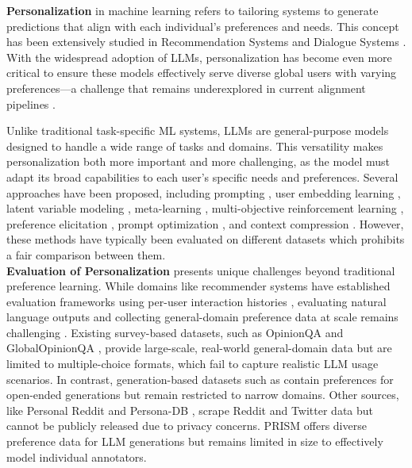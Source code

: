 \textbf{Personalization} in machine learning refers to tailoring systems to generate predictions that align with each individual's preferences and needs. This concept has been extensively studied in Recommendation Systems \cite{sarwar2001item, he2017neural} and Dialogue Systems \cite{zhang1801personalizing, li_persona-based_2016}. With the widespread adoption of LLMs, personalization has become even more critical to ensure these models effectively serve diverse global users with varying preferences—a challenge that remains underexplored in current alignment pipelines \cite{sorensen_roadmap_2024}.


Unlike traditional task-specific ML systems, LLMs are general-purpose models designed to handle a wide range of tasks and domains. This versatility makes personalization both more important and more challenging, as the model must adapt its broad capabilities to each user's specific needs and preferences. Several approaches have been proposed, including prompting \cite{hwang_aligning_2023}, user embedding learning \cite{li_personalized_2024, feng_modular_2024}, latent variable modeling \cite{poddar_personalizing_2024, siththaranjan_distributional_2024}, meta-learning \cite{zhao_group_2023}, multi-objective reinforcement learning \cite{jang_personalized_2023}, preference elicitation \cite{li_eliciting_2023}, prompt optimization \cite{kim_few-shot_2024}, and context compression \cite{kim_compressed_2024}. However, these methods have typically been evaluated on different datasets which prohibits a fair comparison between them.\\
\textbf{Evaluation of Personalization} presents unique challenges beyond traditional preference learning. While domains like recommender systems have established evaluation frameworks using per-user interaction histories \cite{harper2015movielens}, evaluating natural language outputs and collecting general-domain preference data at scale remains challenging \cite{zhou-etal-2022-deconstructing,clark2021all, dong2024can}. Existing survey-based datasets, such as OpinionQA \cite{santurkar_whose_2023} and GlobalOpinionQA \cite{durmus_towards_2024}, provide large-scale, real-world general-domain data but are limited to multiple-choice formats, which fail to capture realistic LLM usage scenarios. In contrast, generation-based datasets such as \citet{salemi_lamp_2023, wang_learning_2023, stiennon_learning_2022} contain preferences for open-ended generations but remain restricted to narrow domains. Other sources, like Personal Reddit \cite{staab_beyond_2023} and Persona-DB \cite{sun_persona-db_2024}, scrape Reddit and Twitter data but cannot be publicly released due to privacy concerns. PRISM \cite{kirk_prism_2024} offers diverse preference data for LLM generations but remains limited in size to effectively model individual annotators.

